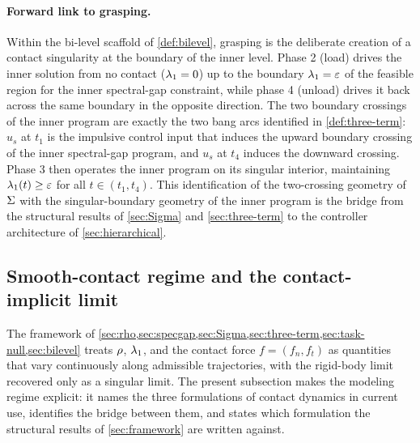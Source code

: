 \paragraph{Forward link to grasping.}
Within the bi-level scaffold of \cref{def:bilevel}, grasping is the
deliberate creation of a contact singularity at the boundary of
the inner level. Phase 2 (load) drives the inner solution from no
contact ($\lambda_{1} = 0$) up to the boundary $\lambda_{1} = \varepsilon$
of the feasible region for the inner spectral-gap constraint,
while phase 4 (unload) drives it back
across the same boundary in the opposite direction. The two
boundary crossings of the inner program are exactly the two bang
arcs identified in \cref{def:three-term}: $u_{s}$ at $t_{1}$ is
the impulsive control input that induces the upward boundary
crossing of the inner spectral-gap program, and $u_{s}$ at
$t_{4}$ induces the downward crossing. Phase 3 then operates the
inner program on its singular interior, maintaining
$\lambda_{1}(t) \ge \varepsilon$ for all $t \in (t_{1}, t_{4})$.
This identification of the two-crossing geometry of $\Sigma$
with the singular-boundary geometry of the inner program is the
bridge from the structural results of \cref{sec:Sigma} and
\cref{sec:three-term} to the controller architecture of
\cref{sec:hierarchical}.

\subsection{Smooth-contact regime and the contact-implicit limit}
\label{sec:smooth-contact}

The framework of \cref{sec:rho,sec:specgap,sec:Sigma,sec:three-term,sec:task-null,sec:bilevel}
treats $\rho$, $\lambda_{1}$, and the contact force $f = (f_{n},
f_{t})$ as quantities that vary continuously along admissible
trajectories, with the rigid-body limit recovered only as a
singular limit. The present subsection makes the modeling regime
explicit: it names the three formulations of contact dynamics in
current use, identifies the bridge between them, and states which
formulation the structural results of \cref{sec:framework} are written against.

